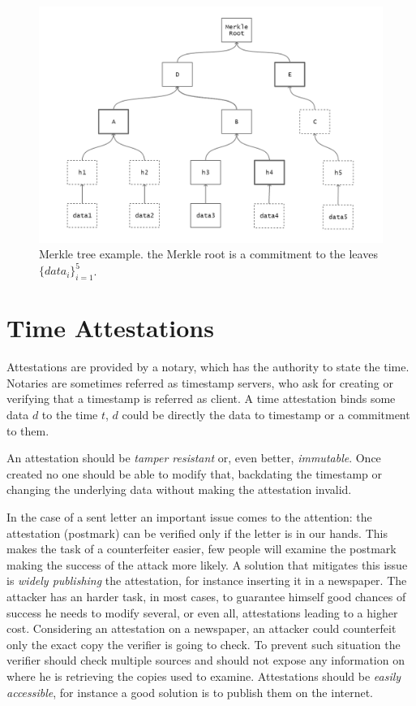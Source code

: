 \begin{figure}
	\begin{center}
		\includegraphics[width=\linewidth]{Images/merkle-tree.png}
		\caption[Merkle tree example]{Merkle tree example. the Merkle root is a commitment to the leaves $\{data_i\}_{i=1}^5$.}
		\label{fig:merkle-tree}
	\end{center}
\end{figure}

\section{Time Attestations}

Attestations are provided by a notary, which has the authority to state the time.
Notaries are sometimes referred as timestamp servers, who ask for creating or verifying that a timestamp is referred as client.
A time attestation binds some data $d$ to the time $t$, $d$ could be directly the data to timestamp or a commitment to them. 

An attestation should be \textit{tamper resistant} or, even better, \textit{immutable}. Once created no one should be able to modify that, backdating the timestamp or changing the underlying data without making the attestation invalid.

In the case of a sent letter an important issue comes to the attention: the attestation (postmark) can be verified only if the letter is in our hands. This makes the task of a counterfeiter easier, few people will examine the postmark making the success of the attack more likely. A solution that mitigates this issue is \textit{widely publishing} the attestation, for instance inserting it in a newspaper. The attacker has an harder task, in most cases, to guarantee himself good chances of success he needs to modify several, or even all, attestations leading to a higher cost. Considering an attestation on a newspaper, an attacker could counterfeit only the exact copy the verifier is going to check. To prevent such situation the verifier should check multiple sources and should not expose any information on where he is retrieving the copies used to examine. Attestations should be \textit{easily accessible}, for instance a good solution is to publish them on the internet.

